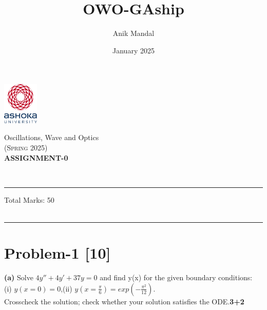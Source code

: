 \documentclass[12pt, a4paper]{article}
\title{OWO-GAship}
\author{Anik Mandal}
\date{January 2025}
\begin{document}
\begin{minipage}[t][][c]{0.1\textwidth}
    \begin{flushleft}
        \includegraphics[height=2cm]{tex-resources/Ashoka Logo.png}
    \end{flushleft}
\end{minipage}
\begin{minipage}[t][][c]{0.85\textwidth}
    \begin{center}
        {\LARGE Oscillations, Wave and Optics}\\ \vspace{0.5em}
        \textsc{(Spring 2025)}\\
        \vspace{1em}
        \textbf{\Large ASSIGNMENT-0} \\
    \end{center}
\end{minipage}
\vspace{10pt}\\
\rule[0em]{\textwidth}{0.75pt}

\hfill 
Total Marks: 50   \\
\hfill
{}\\
\vspace{.2cm}
\rule[0em]{\textwidth}{1.75pt}
\vspace{-1cm}

\section*{Problem-1 \hfill \textbf{[10]}}
\textbf{(a)} Solve $4y'' + 4y' + 37y=0$ and find y(x) for the given boundary conditions: \\
(i) $y(x=0)=0$,(ii) $y(x=\frac{\pi}{6})=exp(-\frac{\pi^2}{12})$.\\
Crosscheck the solution; check whether your solution satisfies the ODE.\hfill \textbf{3+2}\\
\end{document}
